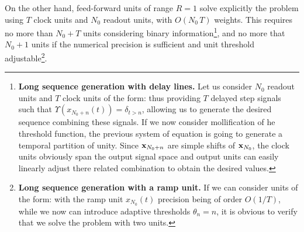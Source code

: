 On the other hand, feed-forward units of range $R=1$ solve explicitly the problem using $T$ clock units and $N_0$ readout units, with $O(N_0\,T)$ weights. This requires no more than $N_0+T$ units considering binary information\footnote{{\bf Long sequence generation with delay lines.} Let us consider $N_0$ readout units and $T$ clock units of the form: 
thus providing $T$ delayed step signals such that $\Upsilon(x_{N_0+n}(t)) = \delta_{t>n}$, allowing us to generate the desired sequence combining these signals. If we now consider mollification of he threshold function, the previous system of equation is going to generate a temporal partition of unity. Since ${\bf x}_{N_0+n}$ are simple shifts of ${\bf x}_{N_0}$, the clock units obviously span the output signal space and output units can easily linearly adjust there related combination to obtain the desired values.
\hr}, and no more that $N_0+1$ units if the numerical precision is sufficient and unit threshold adjustable\footnote{{\bf Long sequence generation with a ramp unit.} If we can consider units of the form: 
with the ramp unit $x_{N_0}(t)$ precision being of order $O(1/T)$, while we now can introduce adaptive thresholds $\theta_n = n$, it is obvious to verify that we solve the problem with two units.
\hr}.
